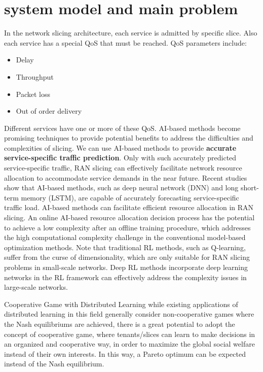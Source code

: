 \documentclass[conference]{IEEEtran}
\begin{document}
\section{system model and main problem}
In the network slicing architecture, each service is admitted by specific slice. Also each service has a special QoS that must be reached. 
QoS parameters include:

\begin{itemize}
\item Delay
\item Throughput
\item Packet loss
\item Out of order delivery
\end{itemize}  

Different services have one or more of these QoS.
AI-based methods become promising techniques to provide
potential benefits to address the difficulties and complexities of slicing.
We can use AI-based methods
to provide \textbf{accurate service-specific traffic prediction}.
Only
with such accurately predicted service-specific traffic, RAN
slicing can effectively facilitate network resource allocation to
accommodate service demands in the near future. Recent studies show that AI-based methods, such as deep neural network
(DNN) and long short-term memory (LSTM), are capable of
accurately forecasting service-specific traffic load.
AI-based methods can facilitate efficient resource allocation in RAN slicing. An online AI-based resource allocation decision process has the potential to achieve
a low complexity after an offline training procedure, which
addresses the high computational complexity challenge in the
conventional model-based optimization methods.
 Note that traditional RL methods, such as
Q-learning, suffer from the curse of dimensionality, which are
only suitable for RAN slicing problems in small-scale networks. Deep RL methods incorporate deep learning networks
in the RL framework can effectively address the complexity
issues in large-scale networks. 


Cooperative Game with Distributed Learning while existing applications of distributed learning in this field generally consider non-cooperative games where the Nash
equilibriums are achieved, there is a great potential to adopt the concept of cooperative game, where tenants/slices can learn to
make decisions in an organized and cooperative way, in order to maximize the global social welfare instead of their own interests.
In this way, a Pareto optimum can be expected instead of the Nash equilibrium.
\end{document}
